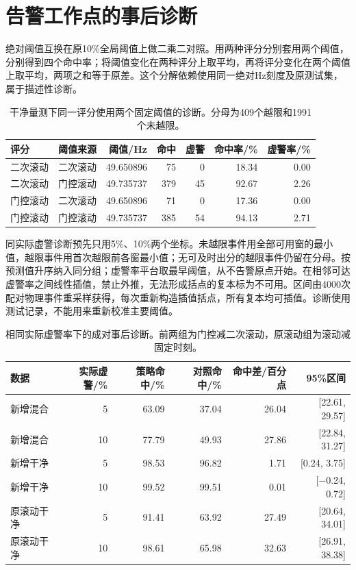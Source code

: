 \documentclass[UTF8,a4paper,11pt]{ctexart}
\begin{document}
\clearpage\section{告警工作点的事后诊断}

绝对阈值互换在原10\%全局阈值上做二乘二对照。用两种评分分别套用两个阈值，分别得到四个命中率；将阈值变化在两种评分上取平均，再将评分变化在两个阈值上取平均，两项之和等于原差。这个分解依赖使用同一绝对Hz刻度及原测试集，属于描述性诊断。

\begin{table}[!htbp]\centering\small\setlength{\tabcolsep}{4pt}
\caption{干净量测下同一评分使用两个固定阈值的诊断。分母为409个越限和1991个未越限。}\label{tab:threshold-swap}
\begin{tabular}{llrrrrr}
\toprule
评分 & 阈值来源 & 阈值/Hz & 命中 & 虚警 & 命中率/\% & 虚警率/\% \\
\midrule
二次滚动 & 二次滚动 & 49.650896 & 75 & 0 & 18.34 & 0.00 \\
二次滚动 & 门控滚动 & 49.735737 & 379 & 45 & 92.67 & 2.26 \\
门控滚动 & 二次滚动 & 49.650896 & 71 & 0 & 17.36 & 0.00 \\
门控滚动 & 门控滚动 & 49.735737 & 385 & 54 & 94.13 & 2.71 \\
\bottomrule\end{tabular}\end{table}

同实际虚警诊断预先只用5\%、10\%两个坐标。未越限事件用全部可用窗的最小值，越限事件用首次越限前各窗最小值；无可及时出分的越限事件仍留在分母。按预测值升序纳入同分组；虚警率平台取最早阈值，从不告警原点开始。在相邻可达虚警率之间线性插值，禁止外推，无法形成括点的复本标为不可用。区间由4000次配对物理事件重采样获得，每次重新构造插值括点，所有复本均可插值。诊断使用测试记录，不能用来重新校准主要阈值。

\begin{table}[!htbp]\centering\small\setlength{\tabcolsep}{4pt}
\caption{相同实际虚警率下的成对事后诊断。前两组为门控减二次滚动，原滚动组为滚动减固定时刻。}\label{tab:matched-far}
\begin{tabular}{lrrrrr}
\toprule
数据 & 实际虚警/\% & 策略命中/\% & 对照命中/\% & 命中差/百分点 & 95\%区间 \\
\midrule
新增混合 & 5 & 63.09 & 37.04 & 26.04 & [22.61, 29.57] \\
新增混合 & 10 & 77.79 & 49.93 & 27.86 & [22.84, 31.27] \\
新增干净 & 5 & 98.53 & 96.82 & 1.71 & [0.24, 3.75] \\
新增干净 & 10 & 99.52 & 99.51 & 0.01 & [−0.24, 0.72] \\
原滚动干净 & 5 & 91.41 & 63.92 & 27.49 & [20.64, 34.01] \\
原滚动干净 & 10 & 98.61 & 65.98 & 32.63 & [26.91, 38.38] \\
\bottomrule\end{tabular}\end{table}
\end{document}

